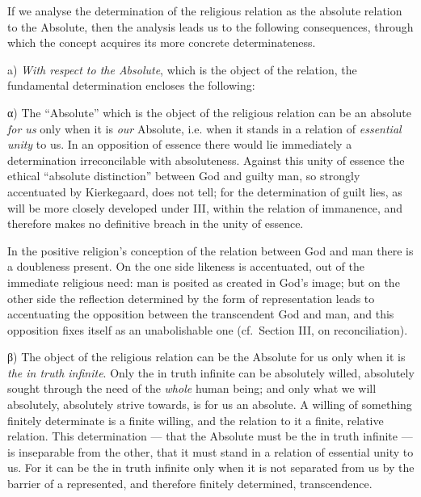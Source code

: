 \documentclass[12pt,a4paper]{book}
\begin{document}
If we analyse the determination of the religious relation as the absolute
relation to the Absolute, then the analysis leads us to the following
consequences, through which the concept acquires its more concrete
determinateness.

a) \emph{With respect to the Absolute}, which is the object of the relation,
the fundamental determination encloses the following:

α) The ``Absolute'' which is the object of the religious relation can be an
absolute \emph{for us} only when it is \emph{our} Absolute, i.e. when it stands
in a relation of \emph{essential unity} to us. In an opposition of essence
there would lie immediately a determination irreconcilable with absoluteness.
Against this unity of essence the ethical ``absolute distinction'' between God
and guilty man, so strongly accentuated by Kierkegaard, does not tell; for the
determination of guilt lies, as will be more closely developed under III,
within the relation of immanence, and therefore makes no definitive breach in
the unity of essence.

In the positive religion's conception of the relation between God and man
there is a doubleness present. On the one side likeness is accentuated, out of
the immediate religious need: man is posited as created in God's image; but on
the other side the reflection determined by the form of representation leads to
accentuating the opposition between the transcendent God and man, and this
opposition fixes itself as an unabolishable one (cf.\ Section III, on
reconciliation).

β) The object of the religious relation can be the Absolute for us only when it
is \emph{the in truth infinite}. Only the in truth infinite can be absolutely
willed, absolutely sought through the need of the \emph{whole} human being; and
only what we will absolutely, absolutely strive towards, is for
us an absolute. A willing of something finitely determinate is a finite
willing, and the relation to it a finite, relative relation. This
determination --- that the Absolute must be the in truth infinite --- is
inseparable from the other, that it must stand in a relation of essential
unity to us. For it can be the in truth infinite only when it is not separated
from us by the barrier of a represented, and therefore finitely determined,
transcendence.
\end{document}
